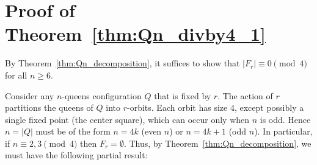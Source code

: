 \documentclass[pdflatex,sn-mathphys-num]{sn-jnl}
\theoremstyle{thmstyleone}
\theoremstyle{thmstyletwo}
\theoremstyle{thmstylethree}
\begin{document}
\section{Proof of Theorem~\ref{thm:Qn_divby4_1}}\label{symmetry_of_Qn}
By Theorem~\ref{thm:Qn_decomposition}, it suffices to show that $|F_r| \equiv 0 \pmod{4}$ for all $n \ge 6$.


Consider any $n$-queens configuration $Q$ that is fixed by $r$. The action of $r$ partitions the queens of $Q$ into $r$-orbits.
Each orbit has size $4$, except possibly a single fixed point (the center square), which can occur only when $n$ is odd.
Hence $n=|Q|$ must be of the form $n=4k$ (even $n$) or $n=4k+1$ (odd $n$). In particular, if $n \equiv 2,3\pmod{4}$ then $F_r=\emptyset$.
Thus, by Theorem~\ref{thm:Qn_decomposition}, we must have the following partial result:
\end{document}

